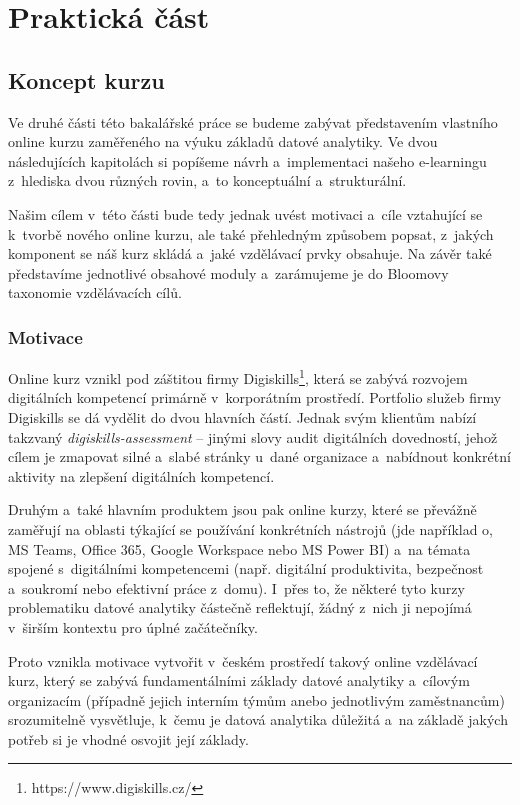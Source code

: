 \part{Praktická část}

\hypertarget{koncept-kurzu}{%
\chapter{Koncept kurzu}\label{koncept-kurzu}}

Ve druhé části této bakalářské práce se budeme zabývat představením vlastního online kurzu zaměřeného na výuku základů datové analytiky. Ve dvou následujících kapitolách si popíšeme návrh a~implementaci našeho e-learningu z~hlediska dvou různých rovin, a~to konceptuální a~strukturální.

Našim cílem v~této části bude tedy jednak uvést motivaci a~cíle vztahující se k~tvorbě nového online kurzu, ale také přehledným způsobem popsat, z~jakých komponent se náš kurz skládá a~jaké vzdělávací prvky obsahuje. Na závěr také představíme jednotlivé obsahové moduly a~zarámujeme je do Bloomovy taxonomie vzdělávacích cílů.

\hypertarget{motivace}{%
\section{Motivace}\label{motivace}}

Online kurz vznikl pod záštitou firmy Digiskills\footnote{https://www.digiskills.cz/}, která se zabývá rozvojem digitálních kompetencí primárně v~korporátním prostředí. Portfolio služeb firmy Digiskills se dá vydělit do dvou hlavních částí. Jednak svým klientům nabízí takzvaný \emph{digiskills-assessment} -- jinými slovy audit digitálních dovedností, jehož cílem je zmapovat silné a~slabé stránky u~dané organizace a~nabídnout konkrétní aktivity na zlepšení digitálních kompetencí.

Druhým a~také hlavním produktem jsou pak online kurzy, které se převážně zaměřují na oblasti týkající se používání konkrétních nástrojů (jde například o, MS Teams, Office 365, Google Workspace nebo MS Power BI) a~na témata spojené s~digitálními kompetencemi (např. digitální produktivita, bezpečnost a~soukromí nebo efektivní práce z~domu). I~přes to, že některé tyto kurzy problematiku datové analytiky částečně reflektují, žádný z~nich ji nepojímá v~širším kontextu pro úplné začátečníky.

Proto vznikla motivace vytvořit v~českém prostředí takový online vzdělávací kurz, který se zabývá fundamentálními základy datové analytiky a~cílovým organizacím (případně jejich interním týmům anebo jednotlivým zaměstnancům) srozumitelně vysvětluje, k~čemu je datová analytika důležitá a~na základě jakých potřeb si je vhodné osvojit její základy.

